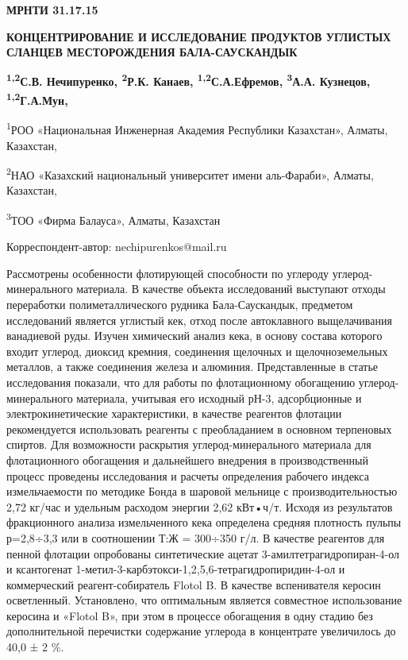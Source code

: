 \newpage
{\bfseries МРНТИ 31.17.15}

{\bfseries КОНЦЕНТРИРОВАНИЕ И ИССЛЕДОВАНИЕ ПРОДУКТОВ УГЛИСТЫХ СЛАНЦЕВ
МЕСТОРОЖДЕНИЯ БАЛА-САУСКАНДЫК}

{\bfseries \textsuperscript{1,2}С.В. Нечипуренко, \textsuperscript{2}Р.К.
Канаев, \textsuperscript{1,2}С.А.Ефремов, \textsuperscript{3}А.А.
Кузнецов, \textsuperscript{1,2}Г.А.Мун,}

\textsuperscript{1}РОО «Национальная Инженерная Академия Республики
Казахстан», Алматы, Казахстан,

\textsuperscript{2}НАО «Казахский национальный университет имени
аль-Фараби», Алматы, Казахстан,

\textsuperscript{3}ТОО «Фирма Балауса», Алматы, Казахстан

Корреспондент-автор: nechipurenkos@mail.ru

Рассмотрены особенности флотирующей способности по углероду
углерод-минерального материала. В качестве объекта исследований
выступают отходы переработки полиметаллического рудника Бала-Саускандык,
предметом исследований является углистый кек, отход после автоклавного
выщелачивания ванадиевой руды. Изучен химический анализ кека, в основу
состава которого входит углерод, диоксид кремния, соединения щелочных и
щелочноземельных металлов, а также соединения железа и алюминия.
Представленные в статье исследования показали, что для работы по
флотационному обогащению углерод-минерального материала, учитывая его
исходный рН-3, адсорбционные и электрокинетические характеристики, в
качестве реагентов флотации рекомендуется использовать реагенты с
преобладанием в основном терпеновых спиртов. Для возможности раскрытия
углерод-минерального материала для флотационного обогащения и
дальнейшего внедрения в производственный процесс проведены исследования
и расчеты определения рабочего индекса измельчаемости по методике Бонда
в шаровой мельнице с производительностью 2,72 кг/час и удельным расходом
энергии 2,62 кВт•ч/т. Исходя из результатов фракционного анализа
измельченного кека определена средняя плотность пульпы р=2,8÷3,3 или в
соотношении Т:Ж = 300÷350 г/л. В качестве реагентов для пенной флотации
опробованы синтетические ацетат 3-амилтетрагидропиран-4-ол и ксантогенат
1-метил-3-карбэтокси-1,2,5,6-тетрагидропиридин-4-ол и коммерческий
реагент-собиратель Flotol B. В качестве вспенивателя керосин
осветленный. Установлено, что оптимальным является совместное
использование керосина и «Flotol B», при этом в процессе обогащения в
одну стадию без дополнительной перечистки содержание углерода в
концентрате увеличилось до 40,0 ± 2 \%.

